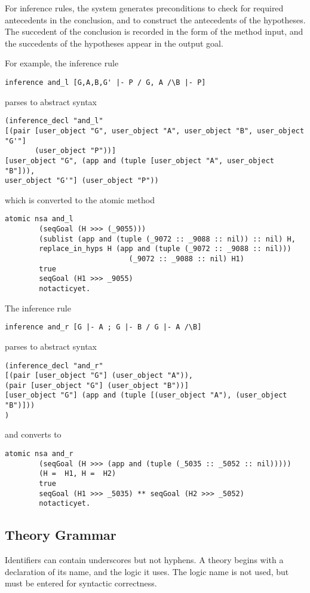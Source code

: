 For inference rules, the system generates preconditions to check
for required antecedents in the conclusion, and to construct the
antecedents of the hypotheses. The succedent of the conclusion is
recorded in the form of the method input, and the succedents of the
hypotheses appear in the output goal.

For example, the inference rule
\begin{verbatim}
inference and_l [G,A,B,G' |- P / G, A /\B |- P]
\end{verbatim}
parses to abstract syntax
\begin{verbatim}
(inference_decl "and_l"
[(pair [user_object "G", user_object "A", user_object "B", user_object "G'"] 
       (user_object "P"))]
[user_object "G", (app and (tuple [user_object "A", user_object "B"])), 
user_object "G'"] (user_object "P"))
\end{verbatim}
which is converted to the atomic method
\begin{verbatim}
atomic nsa and_l
        (seqGoal (H >>> (_9055)))
        (sublist (app and (tuple (_9072 :: _9088 :: nil)) :: nil) H, 
        replace_in_hyps H (app and (tuple (_9072 :: _9088 :: nil))) 
                             (_9072 :: _9088 :: nil) H1)
        true
        seqGoal (H1 >>> _9055)
        notacticyet.
\end{verbatim}
The inference rule
\begin{verbatim}
inference and_r [G |- A ; G |- B / G |- A /\B]
\end{verbatim}
parses to abstract syntax
\begin{verbatim}
(inference_decl "and_r"
[(pair [user_object "G"] (user_object "A")),
(pair [user_object "G"] (user_object "B"))]
[user_object "G"] (app and (tuple [(user_object "A"), (user_object "B")]))
)
\end{verbatim}
and converts to
\begin{verbatim}
atomic nsa and_r
        (seqGoal (H >>> (app and (tuple (_5035 :: _5052 :: nil)))))
        (H =  H1, H =  H2)
        true
        seqGoal (H1 >>> _5035) ** seqGoal (H2 >>> _5052)
        notacticyet.
\end{verbatim}


\subsection{Theory Grammar}\label{grammar}

Identifiers can contain underscores but not hyphens. A theory begins
with a declaration of its name, and the logic it uses. The logic name
is not used, but must be entered for syntactic correctness.

